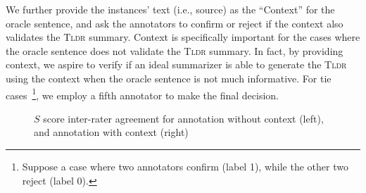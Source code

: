\documentclass[11pt]{article}
\newcommand{\tldr}{\textsc{Tldr}}
\begin{document}
We further provide the instances' text (i.e., source) as the ``Context'' for the oracle sentence, and ask the annotators to confirm or reject if the context also validates the \tldr{} summary. Context is specifically important for the cases where the oracle sentence does not validate the \textsc{Tldr} summary. In fact, by providing context, we aspire to verify if an ideal summarizer is able to generate the \textsc{Tldr} using the context when the oracle sentence is not much informative. For tie cases~\footnote{Suppose a case where two annotators confirm (label 1), while the other two reject (label 0).}, we employ a fifth annotator to make the final decision. 
\begin{figure*}[t]
    \centering
    \footnotesize
{}
    \caption{$S$ score inter-rater agreement for annotation without context (left), and annotation with context (right)}
    \label{fig:agreement_rate}
\end{figure*}
\begin{table}[h]
    \centering
    \caption{Average decision scores given by the annotators for each threshold.}
    \label{tab:ann_score}
\end{table}
\end{document}
